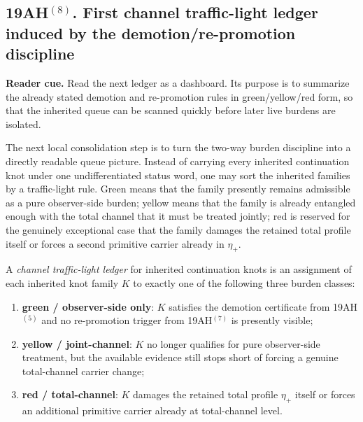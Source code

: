 \subsection*{19AH$^{(8)}$. First channel traffic-light ledger induced by the demotion/re-promotion discipline}
\noindent\textbf{Reader cue.} Read the next ledger as a dashboard. Its purpose is to summarize the already stated demotion and re-promotion rules in green/yellow/red form, so that the inherited queue can be scanned quickly before later live burdens are isolated.

The next local consolidation step is to turn the two-way burden discipline into a directly readable queue picture. Instead of carrying every inherited continuation knot under one undifferentiated status word, one may sort the inherited families by a traffic-light rule. Green means that the family presently remains admissible as a pure observer-side burden; yellow means that the family is already entangled enough with the total channel that it must be treated jointly; red is reserved for the genuinely exceptional case that the family damages the retained total profile itself or forces a second primitive carrier already in \(\eta_+\).

\begin{definition}
A \emph{channel traffic-light ledger} for inherited continuation knots is an assignment of each inherited knot family \(K\) to exactly one of the following three burden classes:
\begin{enumerate}[leftmargin=2em]
  \item \textbf{green / observer-side only}: \(K\) satisfies the demotion certificate from 19AH$^{(5)}$ and no re-promotion trigger from 19AH$^{(7)}$ is presently visible;
  \item \textbf{yellow / joint-channel}: \(K\) no longer qualifies for pure observer-side treatment, but the available evidence still stops short of forcing a genuine total-channel carrier change;
  \item \textbf{red / total-channel}: \(K\) damages the retained total profile \(\eta_+\) itself or forces an additional primitive carrier already at total-channel level.
\end{enumerate}
\end{definition}

